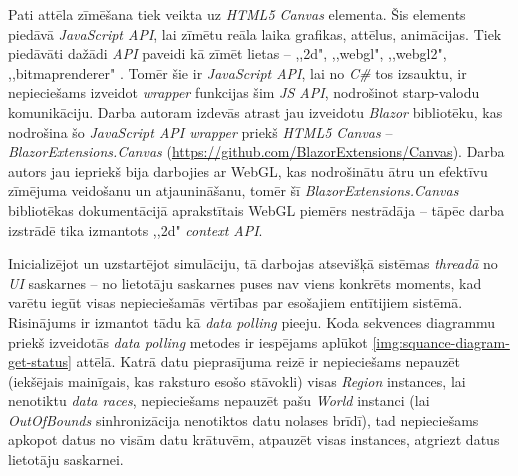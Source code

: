 Pati attēla zīmēšana tiek veikta uz \emph{HTML5 Canvas} elementa\cite{html5:canvas}.
Šis elements piedāvā \emph{JavaScript API}, lai zīmētu reāla laika grafikas, attēlus, animācijas.
Tiek piedāvāti dažādi \emph{API} paveidi kā zīmēt lietas -- ,,2d", ,,webgl", ,,webgl2",
,,bitmaprenderer" \cite{html5:canvas-contexts}. Tomēr šie ir \emph{JavaScript API}, lai
no \emph{C\#} tos izsauktu, ir nepieciešams izveidot \emph{wrapper} funkcijas šim \emph{JS API},
nodrošinot starp-valodu komunikāciju. Darba autoram izdevās atrast jau izveidotu \emph{Blazor} bibliotēku,
kas nodrošina šo \emph{JavaScript API wrapper} priekš  \emph{HTML5 Canvas} -- \emph{BlazorExtensions.Canvas}
(\url{https://github.com/BlazorExtensions/Canvas}).
Darba autors jau iepriekš bija darbojies ar WebGL, kas nodrošinātu ātru un efektīvu
zīmējuma veidošanu un atjaunināšanu, tomēr šī \emph{BlazorExtensions.Canvas} bibliotēkas
dokumentācijā aprakstītais WebGL piemērs nestrādāja -- tāpēc darba izstrādē tika
izmantots ,,2d" \emph{context API}.

Inicializējot un uzstartējot simulāciju, tā darbojas atsevišķā
sistēmas \emph{threadā} no \emph{UI} saskarnes -- no lietotāju saskarnes puses nav
viens konkrēts moments, kad
varētu iegūt visas nepieciešamās vērtības par esošajiem entītijiem sistēmā. Risinājums
ir izmantot tādu kā \emph{data polling}\cite{progr:data-polling} pieeju. Koda sekvences
diagrammu priekš izveidotās \emph{data polling} metodes ir iespējams aplūkot \ref{img:squance-diagram-get-status} attēlā. Katrā
datu pieprasījuma reizē ir nepieciešams nepauzēt (iekšējais mainīgais, kas raksturo esošo stāvokli) visas \emph{Region} instances,
lai nenotiktu \emph{data races}, nepieciešams nepauzēt pašu \emph{World} instanci (lai
\emph{OutOfBounds} sinhronizācija nenotiktos datu nolases brīdī), tad nepieciešams apkopot
datus no visām datu krātuvēm, atpauzēt visas instances, atgriezt datus lietotāju saskarnei.

